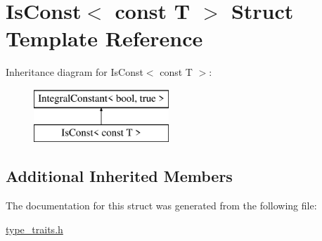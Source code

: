 \hypertarget{struct_is_const_3_01const_01_t_01_4}{}\section{Is\+Const$<$ const T $>$ Struct Template Reference}
\label{struct_is_const_3_01const_01_t_01_4}
Inheritance diagram for Is\+Const$<$ const T $>$\+:\begin{figure}[H]
\begin{center}
\leavevmode
\includegraphics[height=2.000000cm]{struct_is_const_3_01const_01_t_01_4}
\end{center}
\end{figure}
\subsection*{Additional Inherited Members}


The documentation for this struct was generated from the following file\+:\begin{DoxyCompactItemize}
\item 
\hyperlink{type__traits_8h}{type\+\_\+traits.\+h}\end{DoxyCompactItemize}
